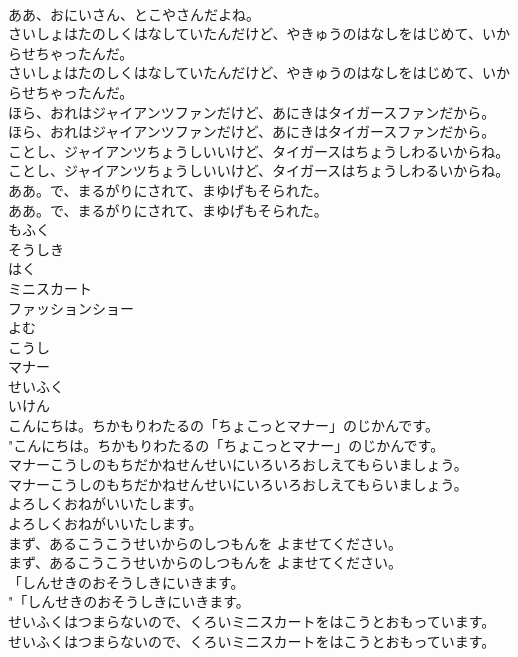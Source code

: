 \documentclass[8pt]{extreport}
\begin{document}
\begin{CJK}{UTF8}{min}
\\	ああ、おにいさん、とこやさんだよね。 
\\	さいしょはたのしくはなしていたんだけど、やきゅうのはなしをはじめて、いからせちゃったんだ。	
\\	さいしょはたのしくはなしていたんだけど、やきゅうのはなしをはじめて、いからせちゃったんだ。 
\\	ほら、おれはジャイアンツファンだけど、あにきはタイガースファンだから。	
\\	ほら、おれはジャイアンツファンだけど、あにきはタイガースファンだから。 
\\	ことし、ジャイアンツちょうしいいけど、タイガースはちょうしわるいからね。	
\\	ことし、ジャイアンツちょうしいいけど、タイガースはちょうしわるいからね。 
\\	ああ。で、まるがりにされて、まゆげもそられた。	
\\	ああ。で、まるがりにされて、まゆげもそられた。 
\\	もふく
\\	そうしき
\\	はく
\\	ミニスカート
\\	ファッションショー
\\	よむ
\\	こうし
\\	マナー
\\	せいふく
\\	いけん
\\	こんにちは。ちかもりわたるの「ちょこっとマナー」のじかんです。	
\\	"こんにちは。ちかもりわたるの「ちょこっとマナー」のじかんです。 
\\	マナーこうしのもちだかねせんせいにいろいろおしえてもらいましょう。	
\\	マナーこうしのもちだかねせんせいにいろいろおしえてもらいましょう。 
\\	よろしくおねがいいたします。	
\\	よろしくおねがいいたします。 
\\	まず、あるこうこうせいからのしつもんを よませてください。	
\\	まず、あるこうこうせいからのしつもんを よませてください。 
\\	「しんせきのおそうしきにいきます。	
\\	"「しんせきのおそうしきにいきます。 
\\	せいふくはつまらないので、くろいミニスカートをはこうとおもっています。	
\\	せいふくはつまらないので、くろいミニスカートをはこうとおもっています。 

\end{CJK}
\end{document}
